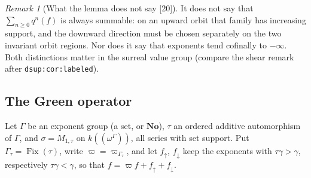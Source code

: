 \documentclass[11pt,oneside]{article}
\numberwithin{equation}{section}
\theoremstyle{definition}
\theoremstyle{remark}
\newtheorem{remark}[remark]{Remark}
\newcommand{\No}{\mathbf{No}}
\newcommand{\Fix}{\operatorname{Fix}}
\newcommand{\src}[1]{\textup{\textsf{\small[#1]}}}
\newcommand{\lbl}[1]{\nolinkurl{#1}}
\begin{document}
\begin{remark}[What the lemma does not say \src{20}]\label{opa:us:rem:notsay}
It does not say that $\sum_{n\ge0}q^n(f)$ is always summable: on an upward orbit that family has increasing support, and the downward
direction must be chosen separately on the two invariant orbit regions. Nor does it say that exponents tend cofinally to $-\infty$. Both
distinctions matter in the surreal value group (compare the shear remark after \lbl{dsup:cor:labeled}).
\end{remark}

\subsection{The Green operator}

Let $\Gamma$ be an exponent group (a set, or $\No$), $\tau$ an ordered additive automorphism of $\Gamma$, and $\sigma=M_{1,\tau}$ on
$k((\omega^\Gamma))$, all series with set support. Put $\Gamma_\tau=\Fix(\tau)$, write $\varpi=\varpi_{\Gamma_\tau}$, and let $f_\uparrow$, $f_\downarrow$ keep
the exponents with $\tau\gamma>\gamma$, respectively $\tau\gamma<\gamma$, so that $f=\varpi f+f_\uparrow+f_\downarrow$.
\end{document}
